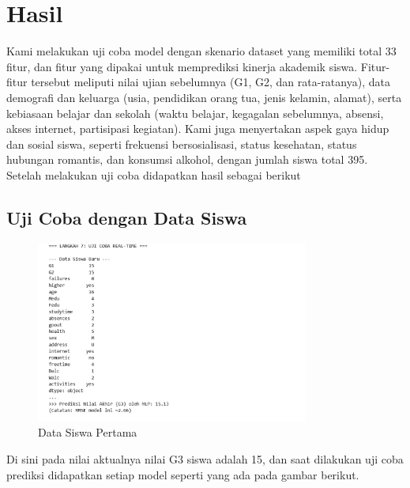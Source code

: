 \chapter*{Hasil}

Kami melakukan uji coba model dengan skenario dataset yang memiliki total 33 fitur, dan fitur yang dipakai untuk memprediksi kinerja akademik siswa. Fitur-fitur tersebut 
meliputi nilai ujian sebelumnya {(G1, G2, dan rata-ratanya)}, data demografi dan keluarga {(usia, pendidikan orang tua, jenis kelamin, alamat)}, 
serta kebiasaan belajar dan sekolah (waktu belajar, kegagalan sebelumnya, absensi, akses internet, partisipasi kegiatan). Kami juga menyertakan 
aspek gaya hidup dan sosial siswa, seperti frekuensi bersosialisasi, status kesehatan, status hubungan romantis, dan konsumsi alkohol, dengan jumlah
siswa total 395.
Setelah melakukan uji coba didapatkan hasil sebagai berikut

\section{Uji Coba dengan Data Siswa}

\begin{figure}[h]
    \centering
    \includegraphics[width=0.8\textwidth]{images/datasiswa2.png}
    \caption{Data Siswa Pertama}
    \label{fig:datasiswa1}
\end{figure}

Di sini pada nilai aktualnya nilai G3 siswa adalah 15, dan saat dilakukan uji coba prediksi didapatkan setiap model seperti yang ada 
pada gambar berikut.

